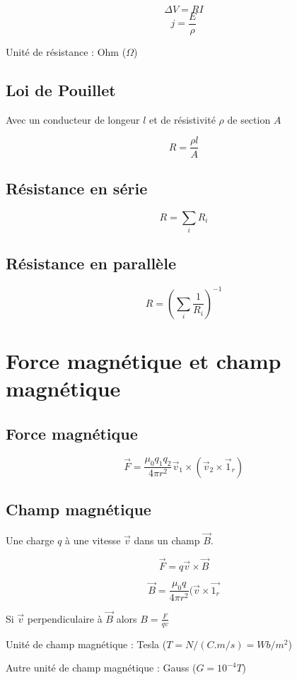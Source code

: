 \documentclass[a4paper,10pt,openright,titlepage]{report}
\begin{document}
$$\Delta V = R I$$
$$j=\frac{E}{\rho}$$

Unité de résistance : Ohm ($\Omega$)

\subsection{Loi de Pouillet}

Avec un conducteur de longeur $l$ et de résistivité $\rho$ de section $A$

$$R = \frac{\rho l}{A}$$

\subsection{Résistance en série}

$$R = \sum_i R_i$$

\subsection{Résistance en parallèle}

$$R = \left( \sum_i \frac{1}{R_i} \right)^{-1}$$

\section{Force magnétique et champ magnétique}

\subsection{Force magnétique}

$$\vec F = \frac{\mu_0 q_1 q_2}{4 \pi r^2} \vec v_1 \times (\vec v_2 \times \vec 1_r)$$

\subsection{Champ magnétique}

Une charge $q$ à une vitesse $\vec v$ dans un champ $\vec B$.

$$\vec F = q \vec v \times \vec B$$

$$\vec B = \frac{\mu_0 q}{4 \pi r^2}(\vec v \times \vec {1_r}$$

Si $\vec v$ perpendiculaire à $\vec B$ alors $B = \frac{F}{qv}$

Unité de champ magnétique : Tesla ($T = N/(C.m/s) = Wb/m^2$)

Autre unité de champ magnétique : Gauss ($G = 10^{-4} T$)
\end{document}
